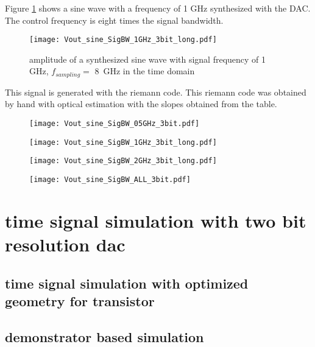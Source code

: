 Figure \ref{fig:1GHz sine} shows a sine wave with a frequency of 1 GHz synthesized with the DAC. The control frequency is eight times the signal bandwidth.
\begin{figure}[htb]
   \centering
   \texttt{[image: Vout\_sine\_SigBW\_1GHz\_3bit\_long.pdf]}
   \caption{amplitude of a synthesized sine wave with signal frequency of 1 GHz, $f_{sampling} =$ \SI{8}{\GHz} in the time domain}
   \label{fig:1GHz sine}
\end{figure}
This signal is generated with the riemann code. This riemann code was obtained by hand with optical estimation with the slopes obtained from the table.

\begin{figure}
\centering
\begin{minipage}{.5\linewidth}
  \centering
  \texttt{[image: Vout\_sine\_SigBW\_05GHz\_3bit.pdf]}
  \label{fig:test1}
\end{minipage}%
\begin{minipage}{.5\linewidth}
  \centering
  \texttt{[image: Vout\_sine\_SigBW\_1GHz\_3bit\_long.pdf]}
  \label{fig:test2}
\end{minipage}
%
%
\centering
\begin{minipage}{.5\linewidth}
  \centering
  \texttt{[image: Vout\_sine\_SigBW\_2GHz\_3bit\_long.pdf]}
  \label{fig:test3}
\end{minipage}%
\begin{minipage}{.5\linewidth}
  \centering
  \texttt{[image: Vout\_sine\_SigBW\_ALL\_3bit.pdf]}
  \label{fig:test4}
\end{minipage}
\end{figure}


\section{time signal simulation with two bit resolution dac}
\subsection{time signal simulation with optimized geometry for transistor}
\subsection{demonstrator based simulation}

